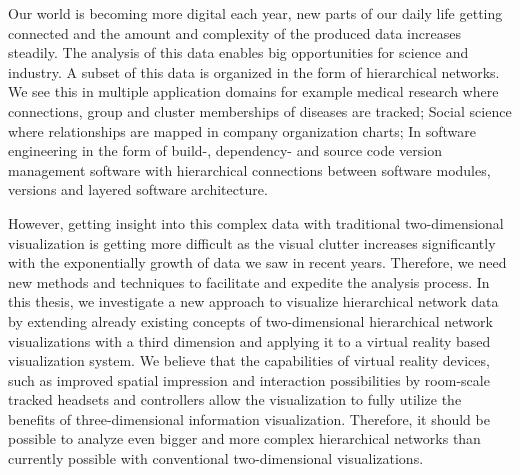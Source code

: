 Our world is becoming more digital each year, new parts of our daily life getting connected and the amount and complexity of the produced data increases steadily.
The analysis of this data enables big opportunities for science and industry.
A subset of this data is organized in the form of hierarchical networks. We see this in multiple application domains for example medical research where connections, group and cluster memberships of diseases are tracked; Social science where relationships are mapped in company organization charts; In software engineering in the form of build-, dependency- and source code version management software with hierarchical connections between software modules, versions and layered software architecture.

However, getting insight into this complex data with traditional two-dimensional visualization is getting more difficult as the visual clutter increases significantly with the exponentially growth of data we saw in recent years. Therefore, we need new methods and techniques to facilitate and expedite the analysis process.
In this thesis, we investigate a new approach to visualize hierarchical network data by extending already existing concepts of two-dimensional hierarchical network visualizations with a third dimension and applying it to a virtual reality based visualization system. We believe that the capabilities of virtual reality devices, such as improved spatial impression and interaction possibilities by room-scale tracked headsets and controllers allow the visualization to fully utilize the benefits of three-dimensional information visualization. Therefore, it should be possible to analyze even bigger and more complex hierarchical networks than currently possible with conventional two-dimensional visualizations.